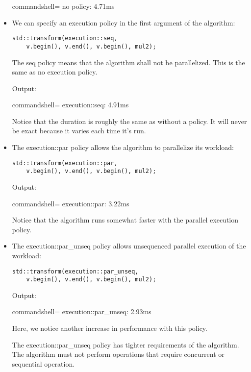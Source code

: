\begin{itemize}
\begin{tcblisting}{commandshell={}}
no policy: 4.71ms
\end{tcblisting}

\item 
We can specify an execution policy in the first argument of the algorithm:

\begin{lstlisting}[style=styleCXX]
std::transform(execution::seq,
	v.begin(), v.end(), v.begin(), mul2);
\end{lstlisting}

The seq policy means that the algorithm shall not be parallelized. This is the same as no execution policy.

Output:

\begin{tcblisting}{commandshell={}}
execution::seq: 4.91ms
\end{tcblisting}

Notice that the duration is roughly the same as without a policy. It will never be exact because it varies each time it's run.

\item 
The execution::par policy allows the algorithm to parallelize its workload:

\begin{lstlisting}[style=styleCXX]
std::transform(execution::par,
	v.begin(), v.end(), v.begin(), mul2);
\end{lstlisting}

Output:

\begin{tcblisting}{commandshell={}}
execution::par: 3.22ms
\end{tcblisting}

Notice that the algorithm runs somewhat faster with the parallel execution policy.

\item 
The execution::par\_unseq policy allows unsequenced parallel execution of the workload:

\begin{lstlisting}[style=styleCXX]
std::transform(execution::par_unseq,
	v.begin(), v.end(), v.begin(), mul2);
\end{lstlisting}

Output:

\begin{tcblisting}{commandshell={}}
execution::par_unseq: 2.93ms
\end{tcblisting}

Here, we notice another increase in performance with this policy.

The execution::par\_unseq policy has tighter requirements of the algorithm. The algorithm must not perform operations that require concurrent or sequential operation.
\end{itemize}

